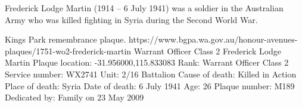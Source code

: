 
Frederick Lodge Martin (1914 – 6 July 1941) was a soldier in the Australian Army who was killed fighting in Syria during the Second World War.

Kings Park remembrance plaque. https://www.bgpa.wa.gov.au/honour-avenues-plaques/1751-wo2-frederick-martin Warrant Officer Class 2 Frederick Lodge Martin Plaque
location: -31.956000,115.833083 Rank: Warrant Officer Class 2 Service number: WX2741 Unit: 2/16 Battalion Cause of death: Killed in Action
Place of death: Syria Date of death: 6 July 1941 Age: 26 Plaque number: M189 Dedicated by: Family on 23 May 2009
